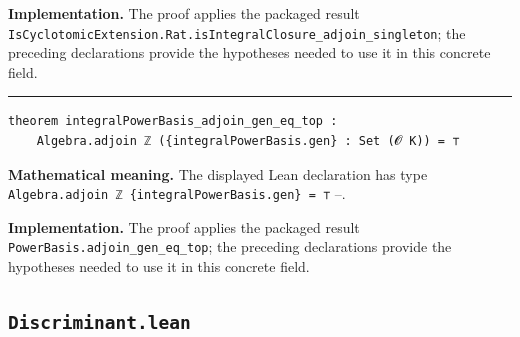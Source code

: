 \documentclass[UTF8,a4paper,11pt,fontset=fandol]{ctexart}
\theoremstyle{definition}
\newcommand{\statementsep}{\par\medskip\hrule\medskip}
\begin{document}
\noindent\textbf{Implementation.} The proof applies the packaged result \texttt{IsCyclotomicExtension.\allowbreak{}Rat.\allowbreak{}isIntegralClosure\_\allowbreak{}adjoin\_\allowbreak{}singleton}; the preceding declarations provide the hypotheses needed to use it in this concrete field.\par
\statementsep
\begin{verbatim}
theorem integralPowerBasis_adjoin_gen_eq_top :
    Algebra.adjoin ℤ ({integralPowerBasis.gen} : Set (𝓞 K)) = ⊤
\end{verbatim}
\noindent\textbf{Mathematical meaning.} The displayed Lean declaration has type \texttt{Algebra.\allowbreak{}adjoin ℤ \{integralPowerBasis.\allowbreak{}gen\} = ⊤} --.\par
\noindent\textbf{Implementation.} The proof applies the packaged result \texttt{PowerBasis.\allowbreak{}adjoin\_\allowbreak{}gen\_\allowbreak{}eq\_\allowbreak{}top}; the preceding declarations provide the hypotheses needed to use it in this concrete field.\par

\subsection{\texttt{Discriminant.lean}}
\end{document}

